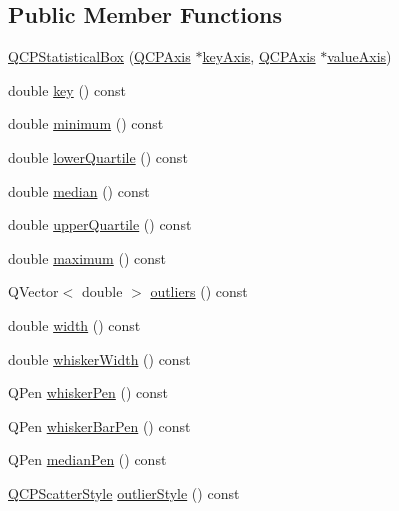 \subsection*{Public Member Functions}
\begin{DoxyCompactItemize}
\item 
\hyperlink{class_q_c_p_statistical_box_a75c2b3e7fcd0741cc981693a2ba63b27}{Q\+C\+P\+Statistical\+Box} (\hyperlink{class_q_c_p_axis}{Q\+C\+P\+Axis} $\ast$\hyperlink{class_q_c_p_abstract_plottable_a72c7a09c22963f2c943f07112b311103}{key\+Axis}, \hyperlink{class_q_c_p_axis}{Q\+C\+P\+Axis} $\ast$\hyperlink{class_q_c_p_abstract_plottable_a3106f9d34d330a6097a8ec5905e5b519}{value\+Axis})
\item 
double \hyperlink{class_q_c_p_statistical_box_a767af754f39872d6308b900a0d1758ca}{key} () const 
\item 
double \hyperlink{class_q_c_p_statistical_box_acd94c05d59c05d9146d3b60d9f52df82}{minimum} () const 
\item 
double \hyperlink{class_q_c_p_statistical_box_af9c4a98f5ca95b5a5a8b140f57b64ace}{lower\+Quartile} () const 
\item 
double \hyperlink{class_q_c_p_statistical_box_a44abdee617fe0bca72e6a2ea3fd492de}{median} () const 
\item 
double \hyperlink{class_q_c_p_statistical_box_abd15951907b54343a89b1f7feddcb7a7}{upper\+Quartile} () const 
\item 
double \hyperlink{class_q_c_p_statistical_box_a928bcf07dd2176affad91d85be03172f}{maximum} () const 
\item 
Q\+Vector$<$ double $>$ \hyperlink{class_q_c_p_statistical_box_a73eaa2f800b47e3832d7f09ad1f3b7e0}{outliers} () const 
\item 
double \hyperlink{class_q_c_p_statistical_box_a0733a7bd575fc5929ce6d507bcc2a04c}{width} () const 
\item 
double \hyperlink{class_q_c_p_statistical_box_ab02392dd54ebd6dd7c8d6fb5c3f0421c}{whisker\+Width} () const 
\item 
Q\+Pen \hyperlink{class_q_c_p_statistical_box_a26d2b34cbaeac2dd639bb21590f317c4}{whisker\+Pen} () const 
\item 
Q\+Pen \hyperlink{class_q_c_p_statistical_box_ab151a727fb0b6396acb3b6c72505a4fe}{whisker\+Bar\+Pen} () const 
\item 
Q\+Pen \hyperlink{class_q_c_p_statistical_box_a96aa0bb650b83e9dfa0387ca4db7fa05}{median\+Pen} () const 
\item 
\hyperlink{class_q_c_p_scatter_style}{Q\+C\+P\+Scatter\+Style} \hyperlink{class_q_c_p_statistical_box_ab7e5a68bce97ba43a7ff18e074c4dcad}{outlier\+Style} () const 

\end{DoxyCompactItemize}
